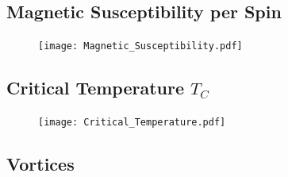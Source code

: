 \subsection{Magnetic Susceptibility per Spin}
\begin{figure}[H]
	\centering
	\texttt{[image: Magnetic\_Susceptibility.pdf]}
\end{figure}

\subsection{Critical Temperature $T_C$}
\begin{figure}[H]
	\centering
	\texttt{[image: Critical\_Temperature.pdf]}
\end{figure}

\subsection{Vortices}